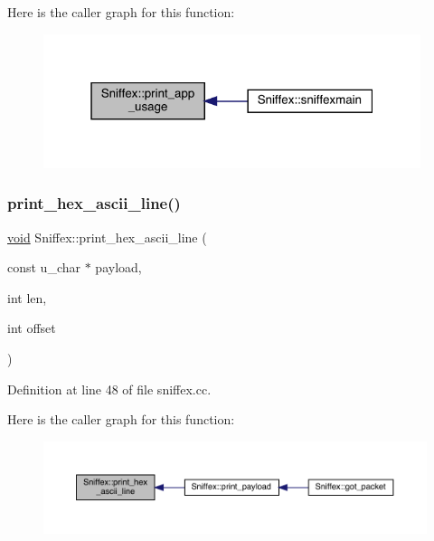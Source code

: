 Here is the caller graph for this function\+:\nopagebreak
\begin{figure}[H]
\begin{center}
\leavevmode
\includegraphics[width=313pt]{class_sniffex_aea81794fe2ac6e2b857eef01c3b109e5_icgraph}
\end{center}
\end{figure}
\mbox{\label{class_sniffex_aec1e34cb4b2ff906304f957c205707ea}} 
\subsubsection{\texorpdfstring{print\+\_\+hex\+\_\+ascii\+\_\+line()}{print\_hex\_ascii\_line()}}
{\footnotesize\ttfamily \mbox{\hyperlink{glad_8h_a950fc91edb4504f62f1c577bf4727c29}{void}} Sniffex\+::print\+\_\+hex\+\_\+ascii\+\_\+line (\begin{DoxyParamCaption}\item[{const u\+\_\+char $\ast$}]{payload,  }\item[{int}]{len,  }\item[{int}]{offset }\end{DoxyParamCaption})}



Definition at line 48 of file sniffex.\+cc.

Here is the caller graph for this function\+:\nopagebreak
\begin{figure}[H]
\begin{center}
\leavevmode
\includegraphics[width=350pt]{class_sniffex_aec1e34cb4b2ff906304f957c205707ea_icgraph}
\end{center}
\end{figure}
\mbox{\label{class_sniffex_a1b24163d441d38f3672800c3de85d149}} 
